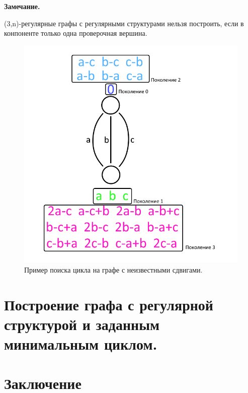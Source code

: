 \documentclass[14pt]{mmcs_article}
\begin{document}
\textbf{Замечание.}

(3,n)-регулярные графы с регулярными структурами нельзя построить, если в конпоненте только одна проверочная вершина.
 
\begin{figure}[H]
  \centering
  \includegraphics[scale=0.6]{Fig_5.png}
  \caption{ Пример поиска цикла на графе с неизвестными сдвигами. }
  \label{stud:fig:5}
\end{figure}
   
\newpage
{}
\section*{Построение графа с регулярной структурой и заданным минимальным циклом.}

\newpage
{}
\section*{Заключение}


\newpage

\renewcommand{\refname}{\centering \textbf{Литература}}
\end{document}
